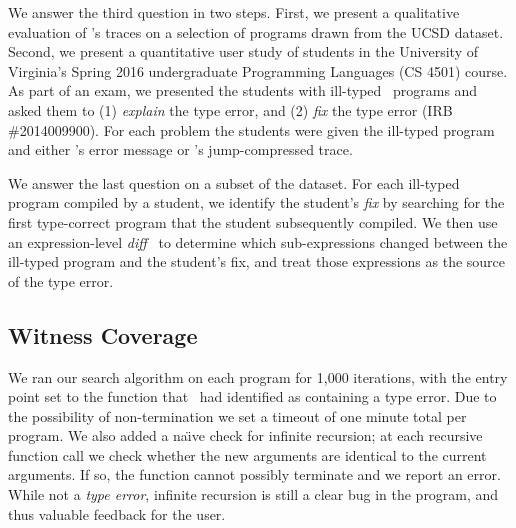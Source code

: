 We answer the third question in two steps.
%
First, we present a qualitative evaluation of \toolname's traces on a
selection of programs drawn from the UCSD dataset.
%
Second, we present a quantitative user study of students in the
University of Virginia's Spring 2016 undergraduate Programming Languages
(CS 4501) course.
%
As part of an exam, we presented the students with ill-typed \ocaml\
programs and asked them to
%
(1) \emph{explain} the type error, and
%
(2) \emph{fix} the type error (IRB \#2014009900).
%
For each problem the students were given the ill-typed program and
either \ocaml's error message or \toolname's jump-compressed trace.

We answer the last question on a subset of the \ucsdbench dataset.
%
For each ill-typed program compiled by a student, we identify the student's
\emph{fix} by searching for the first type-correct program that the student
subsequently compiled.
%
We then use an expression-level \emph{diff}~\cite{Lempsink2009-xf} to
determine which sub-expressions changed between the ill-typed program
and the student's fix, and treat those expressions as the source of the
type error.

\subsection{Witness Coverage}
\label{sec:nanomaly:eval:witness-coverage}
%
We ran our search algorithm on each program for 1,000 iterations, with
the entry point set to the function that \ocaml\ had identified as
containing a type error.
%
Due to the possibility of non-termination we set a timeout of one minute
total per program.
%
%
We also added a na{\"\i}ve check for infinite recursion; at each recursive
function call we check whether the new arguments are identical to the
current arguments.
%
If so, the function cannot possibly terminate and we report an error.
%
While not a \emph{type error}, infinite recursion is still a clear bug
in the program, and thus valuable feedback for the user.

